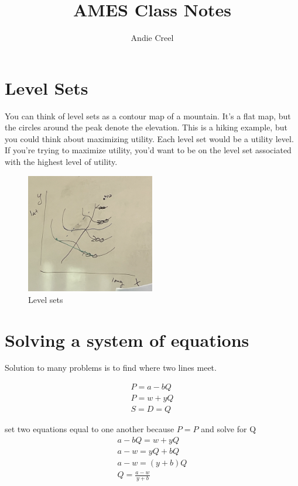 \documentclass{article}
\title{AMES Class Notes}
\author{Andie Creel}
\begin{document}
\maketitle



\section{Level Sets}
You can think of level sets as a contour map of a mountain. It's a flat map, but the circles around the peak denote the elevation. This is a hiking example, but you could think about maximizing utility. Each level set would be a utility level. If you're trying to maximize utility, you'd want to be on the level set associated with the highest level of utility. 

\begin{figure}[htp]
    \centering
        \includegraphics[width=0.5\textwidth]{Screen Shot 2023-09-06 at 10.57.01 AM.png}
    \caption{Level sets}
    \label{fig:sample}
\end{figure}

\section{Solving a system of equations}

Solution to many problems is to find where two lines meet. 

\begin{align}
    P = a-bQ \\
    P = w +yQ\\
    S = D = Q
\end{align}

set two equations equal to one another because $P = P$ and solve for Q
\begin{align}
    a - bQ = w + yQ \\
    a - w = yQ + bQ \\
    a - w = (y+b) Q\\
    Q = \frac{a - w}{y + b}
\end{align}
\end{document}
